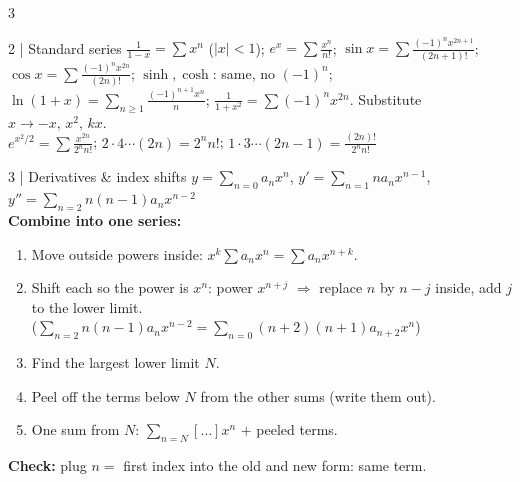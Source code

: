 \documentclass[8pt]{extarticle}
\newcommand{\key}[1]{\textcolor{grn}{\textbf{#1}}}
\newcommand{\chk}[1]{\par\textcolor{grn}{\textbf{Check:}} #1}
\begin{document}
\begin{multicols*}{3}
\begin{card}{2 \;|\; Standard series}
$\frac1{1-x}=\sum x^n$ ($|x|<1$); \;$e^x=\sum\frac{x^n}{n!}$; \;$\sin x=\sum\frac{(-1)^nx^{2n+1}}{(2n+1)!}$; \;$\cos x=\sum\frac{(-1)^nx^{2n}}{(2n)!}$; \;$\sinh,\cosh$: same, no $(-1)^n$; \;$\ln(1+x)=\sum_{n\ge1}\frac{(-1)^{n+1}x^n}{n}$; \;$\frac1{1+x^2}=\sum(-1)^nx^{2n}$. \;Substitute $x\to -x,\,x^2,\,kx$.\\
$e^{x^2/2}=\sum\frac{x^{2n}}{2^nn!}$; \;$2\cdot4\cdots(2n)=2^nn!$; \;$1\cdot3\cdots(2n-1)=\frac{(2n)!}{2^nn!}$
\end{card}

\begin{card}{3 \;|\; Derivatives \& index shifts}
$y=\sum_{n=0}a_nx^n$, \;$y'=\sum_{n=1}na_nx^{n-1}$, \;$y''=\sum_{n=2}n(n-1)a_nx^{n-2}$\\
\key{Combine into one series:}
\begin{enumerate}
\item Move outside powers inside: $x^k\sum a_nx^{n}=\sum a_nx^{n+k}$.
\item Shift each so the power is $x^n$: power $x^{n+j}$ $\Rightarrow$ replace $n$ by $n-j$ inside, add $j$ to the lower limit.\\ ($\sum_{n=2}n(n{-}1)a_nx^{n-2}=\sum_{n=0}(n{+}2)(n{+}1)a_{n+2}x^n$)
\item Find the largest lower limit $N$.
\item Peel off the terms below $N$ from the other sums (write them out).
\item One sum from $N$: $\sum_{n=N}[\dots]x^n$ $+$ peeled terms.
\end{enumerate}
\chk{plug $n=$ first index into the old and new form: same term.}
\end{card}


\end{multicols*}
\end{document}
